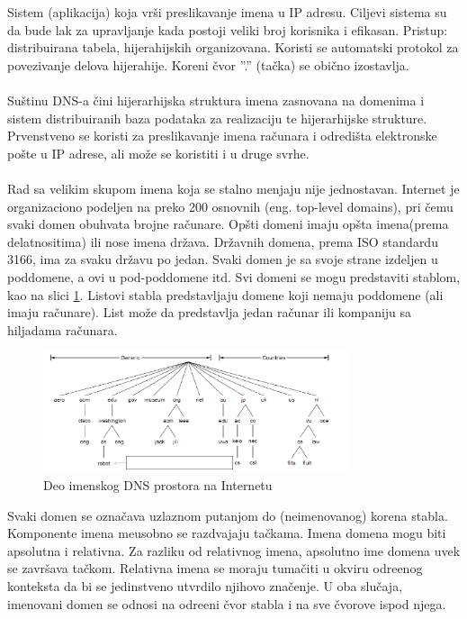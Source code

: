 \documentclass{article} %
\begin{document}
Sistem (aplikacija) koja vr\v si preslikavanje imena u IP adresu. Ciljevi sistema su da bude 
lak za upravljanje kada postoji veliki broj korisnika i efikasan. Pristup: distribuirana tabela, hijerahijskih organizovana. Koristi se automatski protokol za povezivanje delova hijerahije. Koreni \v cvor ''.'' (ta\v cka) se obi\v cno izostavlja.
\\
\\ Su\v stinu DNS-a  \v cini hijerarhijska struktura imena zasnovana na domenima i sistem distribuiranih baza podataka za realizaciju te hijerarhijske strukture. Prvenstveno se koristi za preslikavanje imena ra\v cunara i odredi\v sta elektronske po\v ste u IP adrese, ali mo\v ze se koristiti i u druge svrhe. 
\\
\\ Rad sa velikim skupom imena koja se stalno menjaju  nije jednostavan. Internet je organizaciono podeljen na preko 200 osnovnih (eng. top-level domains), pri \v cemu svaki domen obuhvata brojne ra\v cunare. Op\v sti domeni imaju op\v sta imena(prema delatnositima) ili nose imena dr\v zava. Dr\v zavnih domena, prema ISO standardu 3166, ima za svaku dr\v zavu po jedan. Svaki domen je sa svoje strane izdeljen u poddomene, a ovi u pod-poddomene itd. Svi domeni se mogu predstaviti stablom, kao na slici \ref{dns}. Listovi stabla predstavljaju domene koji nemaju poddomene (ali imaju ra\v cunare). List mo\v ze da predstavlja jedan ra\v cunar ili kompaniju sa hiljadama ra\v cunara. 

\begin{figure}[H]
	\centering
	\includegraphics[width=0.8\textwidth]{slike-aplikativniSloj/dns.png}
	\caption{Deo imenskog DNS prostora na Internetu}\label{dns}
\end{figure}

\noindent Svaki domen se ozna\v cava uzlaznom putanjom do (neimenovanog) korena stabla. Komponente imena me\dj usobno se razdvajaju ta\v ckama. Imena domena mogu biti apsolutna i relativna. Za razliku od relativnog imena, apsolutno ime domena uvek se zavr\v sava ta\v ckom. Relativna imena se moraju tuma\v citi u okviru odre\dj enog konteksta da bi se jedinstveno utvrdilo njihovo zna\v cenje. U oba slu\v caja, imenovani domen se odnosi na odre\dj eni \v cvor stabla i na sve \v cvorove ispod njega. 
\end{document}

